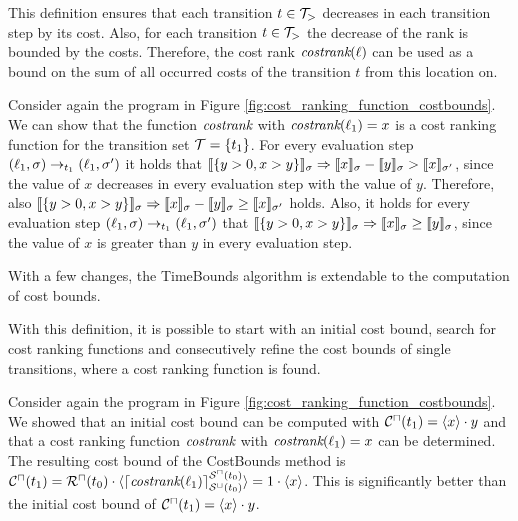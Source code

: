 This definition ensures that each transition $t \in \mathcal{T}_>$ decreases in each transition step by its cost.
Also, for each transition $t \in \mathcal{T}_>$ the decrease of the rank is bounded by the costs.
Therefore, the cost rank $\emph{costrank}(\ell)$ can be used as a bound on the sum of all occurred costs of the transition $t$ from this location on.

\begin{example}
  Consider again the program in Figure \ref{fig:cost_ranking_function_costbounds}.
  We can show that the function $\emph{costrank}$ with $\emph{costrank}(\ell_1) = x$ is a cost ranking function for the transition set $\mathcal{T} = \lbrace t_1 \rbrace$.
  For every evaluation step $(\ell_1,\sigma) \rightarrow_{t_1} (\ell_1,\sigma')$ it holds that $\llbracket \lbrace y > 0, x > y \rbrace \rrbracket_{\sigma} \Rightarrow \llbracket x \rrbracket_{\sigma} - \llbracket y \rrbracket_{\sigma} > \llbracket x \rrbracket_{\sigma'}$, since the value of $x$ decreases in every evaluation step with the value of $y$.
  Therefore, also $\llbracket \lbrace y > 0, x > y \rbrace \rrbracket_{\sigma} \Rightarrow \llbracket x \rrbracket_{\sigma} - \llbracket y \rrbracket_{\sigma} \geq \llbracket x \rrbracket_{\sigma'}$ holds.
  Also, it holds for every evaluation step $(\ell_1,\sigma) \rightarrow_{t_1} (\ell_1,\sigma')$ that $\llbracket \lbrace y > 0, x > y \rbrace \rrbracket_{\sigma} \Rightarrow \llbracket x \rrbracket_{\sigma} \geq \llbracket y \rrbracket_{\sigma}$, since the value of $x$ is greater than $y$ in every evaluation step.
\end{example}

With a few changes, the TimeBounds algorithm is extendable to the computation of cost bounds.



With this definition, it is possible to start with an initial cost bound, search for cost ranking functions and consecutively refine the cost bounds of single transitions, where a cost ranking function is found.

\begin{example}[CostBounds]
  Consider again the program in Figure \ref{fig:cost_ranking_function_costbounds}.
  We showed that an initial cost bound can be computed with ${\mathcal{C}^\sqcap}(t_1) = \langle x\rangle \cdot y$ and that a cost ranking function $\emph{costrank}$ with $\emph{costrank}(\ell_1) = x$ can be determined.
  The resulting cost bound of the CostBounds method is ${\mathcal{C}^\sqcap}(t_1) = {\mathcal{R}^\sqcap}(t_0) \cdot \langle\lceil \emph{costrank}(\ell_1) \rceil^{{\mathcal{S}^\sqcap}(t_0)}_{{\mathcal{S}^\sqcup}(t_0)}\rangle = 1 \cdot \langle x\rangle$.
  This is significantly better than the initial cost bound of ${\mathcal{C}^\sqcap}(t_1) = \langle x\rangle \cdot y$.
\end{example}

